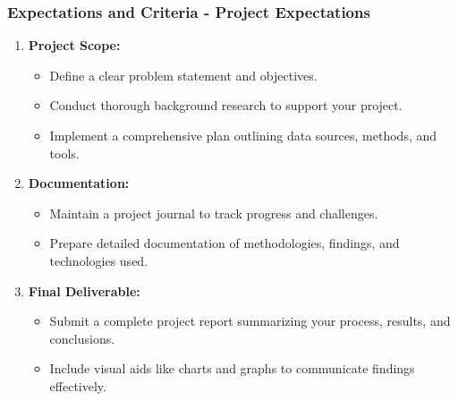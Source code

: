 \documentclass[aspectratio=169]{beamer}
\begin{document}
\begin{frame}[fragile]
    \frametitle{Expectations and Criteria - Project Expectations}
    \begin{enumerate}
        \item \textbf{Project Scope:}
        \begin{itemize}
            \item Define a clear problem statement and objectives.
            \item Conduct thorough background research to support your project.
            \item Implement a comprehensive plan outlining data sources, methods, and tools.
        \end{itemize}
        
        \item \textbf{Documentation:}
        \begin{itemize}
            \item Maintain a project journal to track progress and challenges.
            \item Prepare detailed documentation of methodologies, findings, and technologies used.
        \end{itemize}

        \item \textbf{Final Deliverable:}
        \begin{itemize}
            \item Submit a complete project report summarizing your process, results, and conclusions.
            \item Include visual aids like charts and graphs to communicate findings effectively.
        \end{itemize}
    \end{enumerate}
\end{frame}
\end{document}
